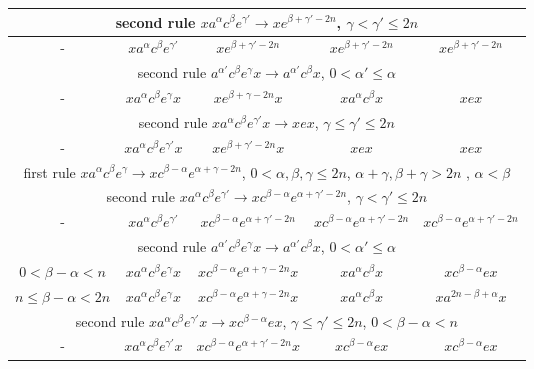 \documentclass{article}
\theoremstyle{definition}
\begin{document}
\begin{center}
\begin{tabular}{|c|c|c|c|c|}
\hline
\hline
\multicolumn{5}{|c|}{second rule $x a^\alpha c^\beta e^{\gamma'} \rightarrow x e^{\beta+\gamma'-2n}$, $\gamma< \gamma' \le 2n$ }\\
\hline
- & $ x a^\alpha c^\beta e^{\gamma'} $ & $x e^{\beta+\gamma'-2n} $  & $x e^{\beta+\gamma'-2n}$ & $x e^{\beta+\gamma'-2n}$ \\
\hline
\multicolumn{5}{|c|}{second rule $a^{\alpha'} c^\beta e^\gamma x  \rightarrow a^{\alpha'} c^\beta x $, $0<\alpha' \le \alpha$}\\
\hline
- & $ x a^\alpha c^\beta e^{\gamma} x $ & $x e^{\beta+\gamma-2n} x$  & $x a^{\alpha} c^\beta x$  & $x e x$ \\
\hline
\multicolumn{5}{|c|}{second rule $ x a^{\alpha} c^\beta e^{\gamma'} x  \rightarrow x e x $, $\gamma \le \gamma' \le 2n$}\\
\hline
- & $ x a^\alpha c^\beta e^{\gamma'} x $ & $x e^{\beta+\gamma'-2n} x$  & $x e x$  & $x e x$ \\
\hline
\hline
\multicolumn{5}{|c|}{first rule $x a^\alpha c^\beta e^\gamma \rightarrow x c^{\beta - \alpha} e^{\alpha+\gamma-2n}$, $0< \alpha,\beta,\gamma  \le 2n$, $\alpha+\gamma, \beta+\gamma> 2n$ , $\alpha < \beta$}\\
\hline
\hline
\multicolumn{5}{|c|}{second rule $x a^\alpha c^\beta e^{\gamma'} \rightarrow x c^{\beta - \alpha} e^{\alpha+\gamma'-2n}$, $\gamma < \gamma' \le 2n$}\\
\hline
- & $x a^\alpha c^\beta e^{\gamma'} $  & $ x c^{\beta - \alpha} e^{\alpha+\gamma'-2n}$ & $ x c^{\beta - \alpha} e^{\alpha+\gamma'-2n}$ & $ x c^{\beta - \alpha} e^{\alpha+\gamma'-2n}$ \\
\hline
\multicolumn{5}{|c|}{second rule $a^{\alpha'} c^\beta e^\gamma x  \rightarrow a^{\alpha'} c^\beta x $, $0<\alpha' \le \alpha$}\\
\hline
$0<\beta-\alpha<n$ &  $ x a^\alpha c^{\beta}  e^\gamma x $ &  $  x c^{\beta - \alpha} e^{\alpha+\gamma-2n}  x $ &   $   x a^{\alpha} c^\beta  x  $ &  $ x  c^{\beta - \alpha} e x $\\
\hline
$n \le \beta-\alpha<2n$   &  $ x a^\alpha c^{\beta}  e^\gamma x $ &  $  x  c^{\beta - \alpha} e^{\alpha+\gamma-2n}  x $ &   $   x a^{\alpha} c^\beta  x  $ &  $ x a^{2n- \beta + \alpha} x $\\
\hline
\multicolumn{5}{|c|}{second rule $x a^{\alpha} c^\beta e^{\gamma'} x  \rightarrow x c^{\beta-\alpha} e x $, $\gamma \le \gamma' \le 2n$, $0<\beta-\alpha <n$}\\
\hline
- &  $ x a^\alpha c^{\beta}  e^{\gamma'} x $ &  $  x c^{\beta - \alpha} e^{\alpha+\gamma'-2n}  x $ &   $   x  c^{\beta-\alpha} e  x  $ &  $ x  c^{\beta - \alpha} e x $\\

\end{tabular}
\end{center}
\end{document}
